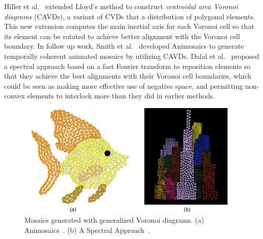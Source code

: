 \newtext
{Hiller et al.~\cite{Hiller2003} extended Lloyd's method to construct \textit{centroidal area Voronoi diagrams} (CAVDs),
a variant of CVDs that  a distribution of polygonal elements.
This new extension computes the main inertial axis for each Voronoi cell so that 
its element can be rotated to achieve better alignment with the Voronoi cell boundary.
In follow up work, Smith et al.~\cite{Smith2005} developed Animosaics to generate temporally coherent animated mosaics by utilizing CAVDs.
Dalal et al.~\cite{Dalal2006} proposed a spectral approach based on a fast Fourier transform to reposition
elements so that they achieve the best alignments with their Voronoi cell boundaries, 
which could be seen as making more effective use of negative
space, and permitting non-convex elements to interlock more than they did in
earlier methods.}

\begin{figure}
\centering
\includegraphics[width=1.0\textwidth]{figures/related/smith_dalal.pdf} 
\caption[Mosaics generated using generalized Lloyd's methods]
{\label{fig_related_secord_hausner} 
\newtext
{
Mosaics generated with generalized Voronoi diagrams.
(a) Animosaics~\cite{Smith2005}.
(b) A Spectral Approach~\cite{Dalal2006}.
}
}
\end{figure}


